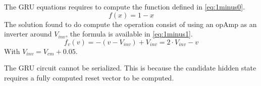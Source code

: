 The GRU equations requires to compute the function defined in \cref{eq:1minus0}.
\begin{equation}\label{eq:1minus0}
  f(x)=1-x
\end{equation}
The solution found to do compute the operation consist of using an \ac{opAmp} as an inverter around $V_{inv}$, the formula is available in \cref{eq:1minus1}.
\begin{equation}\label{eq:1minus1}
  f_v(v)=-(v-V_{inv})+V_{inv}=2\cdot V_{inv} -v
\end{equation}
With $V_{inv}=V_{cm}+0.05$.

The GRU circuit cannot be serialized. This is because the candidate hidden state requires a fully computed reset vector to be computed.
